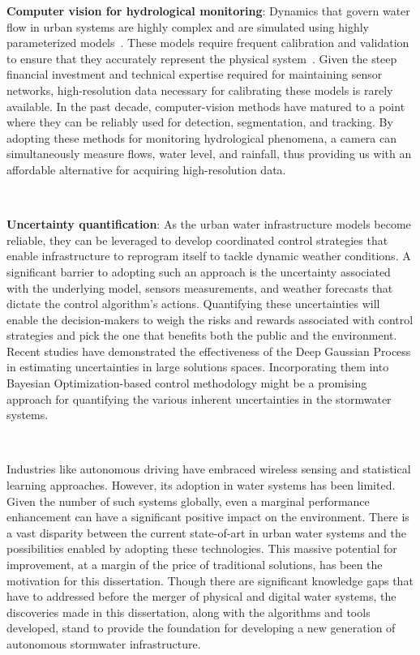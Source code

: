 \textbf{Computer vision for hydrological monitoring}: Dynamics that govern water flow in urban systems are highly complex and are simulated using highly parameterized models~\cite{Rossman2010Storm5.1}.
These models require frequent calibration and validation to ensure that they accurately represent the physical system~\cite{Rossman2010Storm5.1, national2009urban}.
Given the steep financial investment and technical expertise required for maintaining sensor networks, high-resolution data necessary for calibrating these models is rarely available\cite{kerkez2016, Bartos_2018}.
In the past decade, computer-vision methods have matured to a point where they can be reliably used for detection, segmentation, and tracking\cite{LeCun2015DeepLearning}.
By adopting these methods for monitoring hydrological phenomena, a camera can simultaneously measure flows, water level, and rainfall, thus providing us with an affordable alternative for acquiring high-resolution data.

\

\textbf{Uncertainty quantification}: As the urban water infrastructure models become reliable, they can be leveraged to develop coordinated control strategies that enable infrastructure to reprogram itself to tackle dynamic weather conditions\cite{Mullapudi_Lewis_Gruden_Kerkez_2020}.
A significant barrier to adopting such an approach is the uncertainty associated with the underlying model, sensors measurements, and weather forecasts that dictate the control algorithm's actions.
Quantifying these uncertainties will enable the decision-makers to weigh the risks and rewards associated with control strategies and pick the one that benefits both the public and the environment\cite{sadler2019}.
Recent studies have demonstrated the effectiveness of the Deep Gaussian Process in estimating uncertainties in large solutions spaces\cite{damianou2013deep}.
Incorporating them into Bayesian Optimization-based control methodology might be a promising approach for quantifying the various inherent uncertainties in the stormwater systems.

\

Industries like autonomous driving have embraced wireless sensing and statistical learning approaches.
However, its adoption in water systems has been limited. Given the number of such systems globally, even a marginal performance enhancement can have a significant positive impact on the environment.
There is a vast disparity between the current state-of-art in urban water systems and the possibilities enabled by adopting these technologies.
This massive potential for improvement, at a margin of the price of traditional solutions, has been the motivation for this dissertation.
Though there are significant knowledge gaps that have to addressed before the merger of physical and digital water systems, the discoveries made in this dissertation, along with the algorithms and tools developed, stand to provide the foundation for developing a new generation of autonomous stormwater infrastructure.
